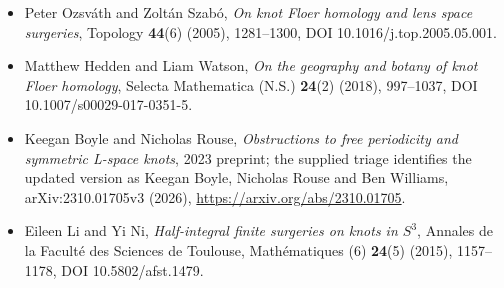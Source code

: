 \documentclass[11pt]{article}
\begin{document}
\begin{itemize}
\item [OS05b] Peter Ozsv\'ath and Zolt\'an Szab\'o, \emph{On knot Floer homology and lens space surgeries}, Topology \textbf{44}(6) (2005), 1281--1300, DOI 10.1016/j.top.2005.05.001.
\item [HW18] Matthew Hedden and Liam Watson, \emph{On the geography and botany of knot Floer homology}, Selecta Mathematica (N.S.) \textbf{24}(2) (2018), 997--1037, DOI 10.1007/s00029-017-0351-5.
\item [BR23b] Keegan Boyle and Nicholas Rouse, \emph{Obstructions to free periodicity and symmetric L-space knots}, 2023 preprint; the supplied triage identifies the updated version as Keegan Boyle, Nicholas Rouse and Ben Williams, arXiv:2310.01705v3 (2026), \url{https://arxiv.org/abs/2310.01705}.
\item [LN15] Eileen Li and Yi Ni, \emph{Half-integral finite surgeries on knots in $S^3$}, Annales de la Facult\'e des Sciences de Toulouse, Math\'ematiques (6) \textbf{24}(5) (2015), 1157--1178, DOI 10.5802/afst.1479.
\end{itemize}
\end{document}
